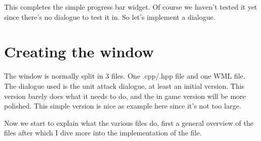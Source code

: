 This completes the simple progress bar widget. Of course we haven't tested it
yet since there's no dialogue to test it in. So let's implement a dialogue.


\section{Creating the window}
\label{sec:creating_the_window}

The window is normally split in 3 files. One .cpp/.hpp file and one WML file.
The dialogue used is the unit attack dialogue, at least an initial version. This
version barely does what it needs to do, and the in game version will be more
polished. This simple version is nice as example here since it's not too large.

Now we start to explain what the various files do, first a general overview of
the files after which I dive more into the implementation of the file.

